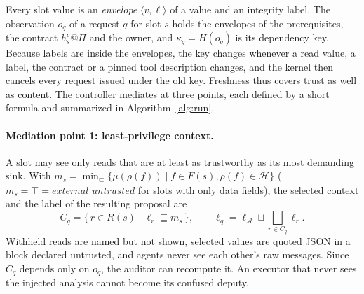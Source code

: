 \documentclass[pdflatex,sn-mathphys-num]{sn-jnl}
\theoremstyle{thmstyleone}%
\theoremstyle{thmstyletwo}%
\theoremstyle{thmstylethree}%
\begin{document}
Every slot value is an \emph{envelope} $\langle v, \ell \rangle$ of a value and an integrity label. The observation $o_q$ of a request $q$ for slot $s$ holds the envelopes of the prerequisites, the contract $h^c_s@\Pi$ and the owner, and $\kappa_q = H(o_q)$ is its dependency key. Because labels are inside the envelopes, the key changes whenever a read value, a label, the contract or a pinned tool description changes, and the kernel then cancels every request issued under the old key. Freshness thus covers trust as well as content. The controller mediates at three points, each defined by a short formula and summarized in Algorithm~\ref{alg:run}.

\paragraph{Mediation point 1: least-privilege context.} A slot may see only reads that are at least as trustworthy as its most demanding sink. With $m_s = \min_{\sqsubseteq}\{\mu(\rho(f)) \mid f \in F(s), \rho(f) \in \mathcal{H}\}$ ($m_s = \top = \textit{external\_untrusted}$ for slots with only data fields), the selected context and the label of the resulting proposal are
\[ C_q = \{\, r \in R(s) \mid \ell_r \sqsubseteq m_s \,\}, \qquad \ell_q = \ell_{\mathcal{A}} \sqcup \textstyle\bigsqcup_{r \in C_q} \ell_r . \]
Withheld reads are named but not shown, selected values are quoted JSON in a block declared untrusted, and agents never see each other's raw messages. Since $C_q$ depends only on $o_q$, the auditor can recompute it. An executor that never sees the injected analysis cannot become its confused deputy.
\end{document}
